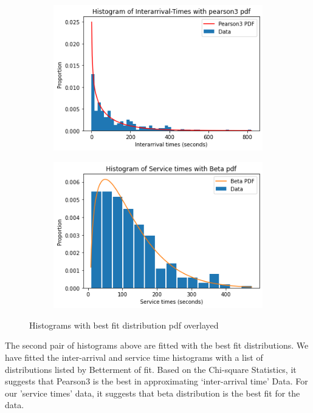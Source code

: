 \documentclass{article}
\begin{document}
\begin{figure}[h]
    \centering
    \begin{subfigure}[b]{0.45\textwidth}
        \centering
        \includegraphics[width=\textwidth]{fig3.png}
        \caption{}
        \label{fig:img3}
    \end{subfigure}
    \hfill
    \begin{subfigure}[b]{0.45\textwidth}
        \centering
        \includegraphics[width=\textwidth]{fig4.png}
        \caption{}
        \label{fig:img4}
    \end{subfigure}

    \caption{Histograms with best fit distribution pdf overlayed}
    \label{fig:two-figs2}
\end{figure}

The second pair of histograms above are fitted with the best fit distributions. We have fitted the inter-arrival and service time histograms with a list of distributions listed by Betterment of fit. Based on the Chi-square Statistics, it suggests that Pearson3 is the best in approximating ‘inter-arrival time’ Data. For our 'service times' data, it suggests that beta distribution is the best fit for the data.
\end{document}
